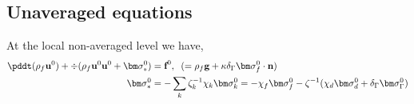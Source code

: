 
\subsection{Unaveraged equations }
At the local non-averaged level we have,
\begin{align}
    \pddt(\rho_f\textbf{u}^0) + \div (\rho_f \textbf{u}^0\textbf{u}^0 + \bm\sigma^0_*)
    &= \textbf{f}^0,
    \;\;(=
    \rho_f \textbf{g}
    +\kappa  \delta_{\Gamma}  \bm\sigma_f^0 \cdot \textbf{n})\\
    \bm\sigma^0_*
    &=
    -\sum_k \zeta^{-1}_k \chi_k \bm\sigma_k^0
    =
      - \chi_f \bm\sigma_f^0
    - \zeta^{-1} (\chi_d \bm\sigma_d^0 + \delta_{\Gamma} \bm\sigma_{\Gamma}^0)
\end{align}

